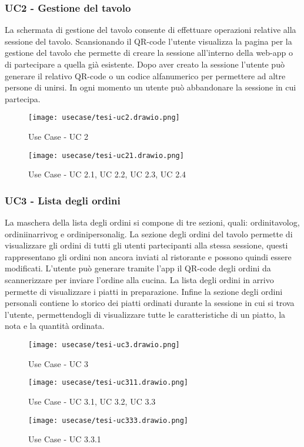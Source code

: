 \subsubsection{UC2 - Gestione del tavolo}
La schermata di gestione del tavolo consente di effettuare operazioni relative alla sessione del tavolo. Scansionando il QR-code l'utente visualizza la pagina per la gestione del tavolo che permette di creare la sessione all'interno della web-app o di partecipare a quella già esistente. Dopo aver creato la sessione l'utente può generare il relativo QR-code o un codice alfanumerico per permettere ad altre persone di unirsi. In ogni momento un utente può abbandonare la sessione in cui partecipa.
\begin{figure}[H]
    \centering
    \texttt{[image: usecase/tesi-uc2.drawio.png]}
    \caption{Use Case - UC 2}
\end{figure}
\begin{figure}[H]
    \centering
    \texttt{[image: usecase/tesi-uc21.drawio.png]}
    \caption{Use Case - UC 2.1, UC 2.2, UC 2.3, UC 2.4}
\end{figure}
\subsubsection{UC3 - Lista degli ordini}
La maschera della lista degli ordini si compone di tre sezioni, quali: \gls{ordinitavolog}, \gls{ordiniinarrivog} e \gls{ordinipersonalig}.
La sezione degli ordini del tavolo permette di visualizzare gli ordini di tutti gli utenti partecipanti alla stessa sessione, questi rappresentano gli ordini non ancora inviati al ristorante e possono quindi essere modificati. L'utente può generare tramite l'app il QR-code degli ordini da scannerizzare per inviare l'ordine alla cucina.
La lista degli ordini in arrivo permette di visualizzare i piatti in preparazione.
Infine la sezione degli ordini personali contiene lo storico dei piatti ordinati durante la sessione in cui si trova l'utente, permettendogli di visualizzare tutte le caratteristiche di un piatto, la nota e la quantità ordinata.
\begin{figure}[H]
    \centering
    \texttt{[image: usecase/tesi-uc3.drawio.png]}
    \caption{Use Case - UC 3}
\end{figure}
\begin{figure}[H]
    \centering
    \texttt{[image: usecase/tesi-uc311.drawio.png]}
    \caption{Use Case - UC 3.1, UC 3.2, UC 3.3}
\end{figure}
\begin{figure}[H]
    \centering
    \texttt{[image: usecase/tesi-uc333.drawio.png]}
    \caption{Use Case - UC 3.3.1}
\end{figure}
